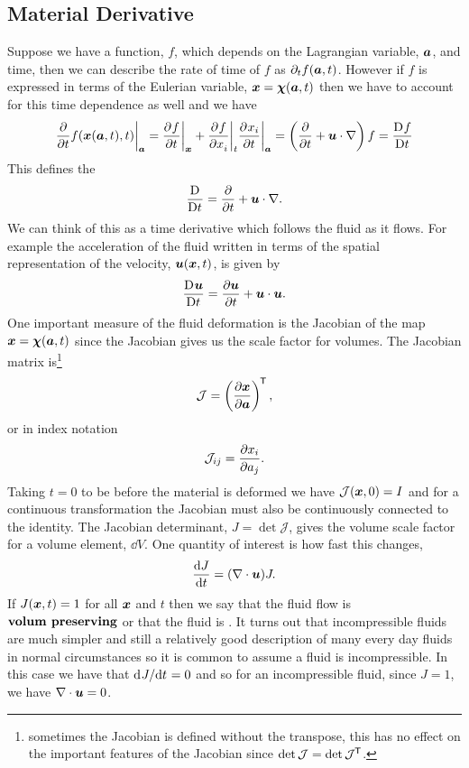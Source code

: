 \documentclass[a4paper]{article}
\renewcommand{\ident}{I}
\newcommand{\mdv}[3][]{\frac{\mathrm{D}^{#1} #2}{\mathrm{D} {#3}^{#1}}}
\newcommand{\jacobianMatrix}{\mathcal{J}}
\begin{document}
    \subsection{Material Derivative}
    Suppose we have a function, \(f\), which depends on the Lagrangian variable, \(\bm{a}\), and time, then we can describe the rate of time of \(f\) as \(\partial_tf(\bm{a}, t)\).
    However if \(f\) is expressed in terms of the Eulerian variable, \(\bm{x} = \bm{\chi}(\bm{a}, t)\) then we have to account for this time dependence as well and we have
    \[\pdv{t}f(\vv{x}(\vv{a}, t), t)\bigg|_{\vv{a}} = \pdvat{f}{t}{\vv{x}} + \pdvat{f}{x_i}{t}\pdvat{x_i}{t}{\vv{a}} = \left( \pdv{t} + \vv{u}\cdot\grad \right)f = \mdv{f}{t}\]
    This defines the 
    \[\mdv{}{t} = \pdv{t} + \vv{u}\cdot\grad.\]
    We can think of this as a time derivative which follows the fluid as it flows.
    For example the acceleration of the fluid written in terms of the spatial representation of the velocity, \(\bm{u}(\bm{x}, t)\), is given by
    \[\mdv{\vv{u}}{t} = \pdv{\vv{u}}{t} + \vv{u}\cdot\vv{u}.\]
    One important measure of the fluid deformation is the Jacobian of the map \(\bm{x} = \bm{\chi}(\bm{a}, t)\) since the Jacobian gives us the scale factor for volumes.
    The Jacobian matrix is\footnote{sometimes the Jacobian is defined without the transpose, this has no effect on the important features of the Jacobian since \(\det \jacobianMatrix = \det \jacobianMatrix\trans\).}
    \[\jacobianMatrix = \left( \pdv{\vv{x}}{\vv{a}} \right)\trans,\]
    or in index notation
    \[\jacobianMatrix_{ij} = \pdv{x_i}{a_j}.\]
    Taking \(t = 0\) to be before the material is deformed we have \(\jacobianMatrix(\vv{x}, 0) = \ident\) and for a continuous transformation the Jacobian must also be continuously connected to the identity.
    The Jacobian determinant, \(J = \det \jacobianMatrix\), gives the volume scale factor for a volume element, \(\dd{V}\).
    One quantity of interest is how fast this changes,
    \[\dv{J}{t} = (\nabla\cdot \bm{u})J.\]
    If \(J(\bm{x}, t) = 1\) for all \(\bm{x}\) and \(t\) then we say that the fluid flow is \(\textbf{volum preserving}\) or that the fluid is .
    It turns out that incompressible fluids are much simpler and still a relatively good description of many every day fluids in normal circumstances so it is common to assume a fluid is incompressible.
    In this case we have that \(\mathrm{d}^{}{J}/\mathrm{d}{t}^{} = 0\) and so for an incompressible fluid, since \(J = 1\), we have \(\nabla\cdot\bm{u} = 0\).
    
\end{document}
